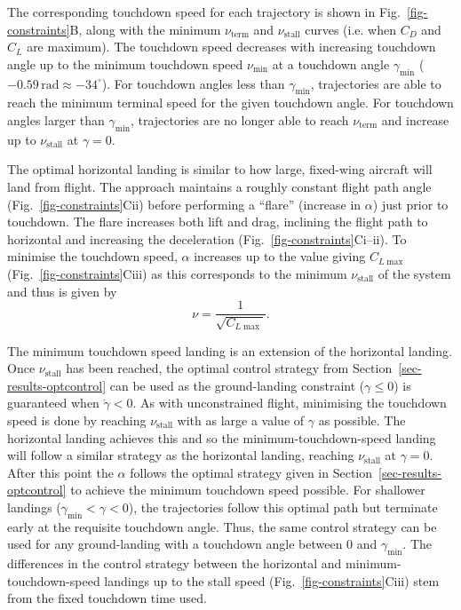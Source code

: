 The corresponding touchdown speed for each trajectory is shown in Fig.~\ref{fig-constraints}B, along with the minimum $\nu_{\mathrm{term}}$ and $\nu_{\mathrm{stall}}$ curves (i.e. when $C_D$ and $C_L$ are maximum). The touchdown speed decreases with increasing touchdown angle up to the minimum touchdown speed $\nu_{\mathrm{min}}$ at a touchdown angle $\gamma_{\mathrm{min}}$ ($-0.59\,\mathrm{rad}\approx -34^\circ$). For touchdown angles less than $\gamma_{\mathrm{min}}$, trajectories are able to reach the minimum terminal speed for the given touchdown angle. For touchdown angles larger than $\gamma_{\mathrm{min}}$, trajectories are no longer able to reach $\nu_{\mathrm{term}}$ and increase up to $\nu_{\mathrm{stall}}$ at $\gamma=0$.

The optimal horizontal landing is similar to how large, fixed-wing aircraft will land from flight. The approach maintains a roughly constant flight path angle (Fig.~\ref{fig-constraints}Cii) before performing a ``flare'' (increase in $\alpha$) just prior to touchdown. The flare increases both lift and drag, inclining the flight path to horizontal and increasing the deceleration (Fig.~\ref{fig-constraints}Ci--ii). To minimise the touchdown speed, $\alpha$ increases up to the value giving $C_{L\max}$ (Fig.~\ref{fig-constraints}Ciii) as this corresponds to the minimum $\nu_{\mathrm{stall}}$ of the system and thus is given by
\[
    \nu = \frac{1}{\sqrt{C_{L\max}}}.
\]

The minimum touchdown speed landing is an extension of the horizontal landing. Once $\nu_{\mathrm{stall}}$ has been reached, the optimal control strategy from Section~\ref{sec-results-optcontrol} can be used as the ground-landing constraint ($\gamma\leq0$) is guaranteed when $\dot{\gamma}<0$. As with unconstrained flight, minimising the touchdown speed is done by reaching $\nu_{\mathrm{stall}}$ with as large a value of $\gamma$ as possible. The horizontal landing achieves this and so the minimum-touchdown-speed landing will follow a similar strategy as the horizontal landing, reaching $\nu_{\mathrm{stall}}$ at $\gamma=0$. After this point the $\alpha$ follows the optimal strategy given in Section~\ref{sec-results-optcontrol} to achieve the minimum touchdown speed possible. For shallower landings ($\gamma_{\mathrm{min}}<\gamma<0$), the trajectories follow this optimal path but terminate early at the requisite touchdown angle. Thus, the same control strategy can be used for any ground-landing with a touchdown angle between $0$ and $\gamma_{\mathrm{min}}$. The differences in the control strategy between the horizontal and minimum-touchdown-speed landings up to the stall speed (Fig.~\ref{fig-constraints}Ciii) stem from the fixed touchdown time used.

